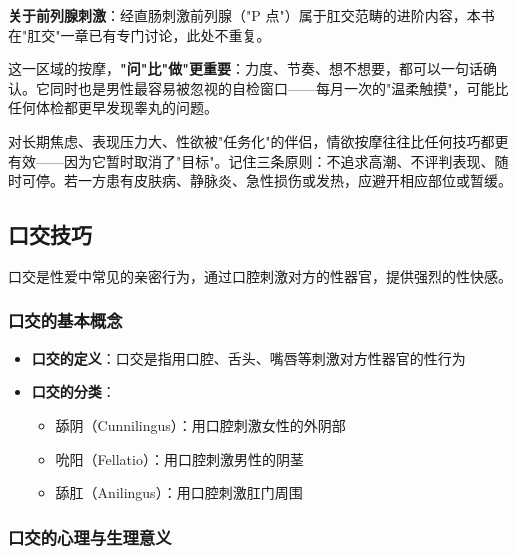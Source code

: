 \documentclass[12pt,UTF8]{ctexbook}
\begin{document}
\vspace{0.5em}
\noindent\textbf{关于前列腺刺激}：经直肠刺激前列腺（"P 点"）属于肛交范畴的进阶内容，本书在"肛交"一章已有专门讨论，此处不重复。

\begin{tcolorbox}[colback=pink!5!white,colframe=red!50!black,title=贴心小叮咛]
这一区域的按摩，\textbf{"问"比"做"更重要}：力度、节奏、想不想要，都可以一句话确认。它同时也是男性最容易被忽视的自检窗口——每月一次的"温柔触摸"，可能比任何体检都更早发现睾丸的问题。
\end{tcolorbox}

\begin{tcolorbox}[colback=pink!5!white,colframe=red!50!black,title=贴心小叮咛]
对长期焦虑、表现压力大、性欲被"任务化"的伴侣，情欲按摩往往比任何技巧都更有效——因为它暂时取消了"目标"。记住三条原则：不追求高潮、不评判表现、随时可停。若一方患有皮肤病、静脉炎、急性损伤或发热，应避开相应部位或暂缓。
\end{tcolorbox}

\subsection{口交技巧}

口交是性爱中常见的亲密行为，通过口腔刺激对方的性器官，提供强烈的性快感。

\subsubsection{口交的基本概念}

\begin{itemize}
\item \textbf{口交的定义}：口交是指用口腔、舌头、嘴唇等刺激对方性器官的性行为
\item \textbf{口交的分类}：
  \begin{itemize}
  \item 舔阴（Cunnilingus）：用口腔刺激女性的外阴部
  \item 吮阳（Fellatio）：用口腔刺激男性的阴茎
  \item 舔肛（Anilingus）：用口腔刺激肛门周围
  \end{itemize}
\end{itemize}

\subsubsection{口交的心理与生理意义}
\end{document}
